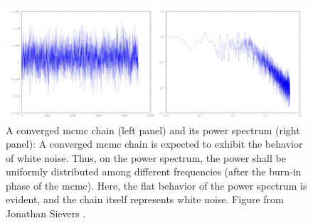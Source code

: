 \documentclass[12pt, TexShade, letterpaper]{report}
\begin{document}
\begin{figure}[h!]
\centering
\includegraphics[scale =0.9]{mcmc_converged.jpg}
\caption[A converged \gls{mcmc} chain and its power spectrum]{A converged \gls{mcmc} chain (left panel) and its power spectrum (right panel): A converged \gls{mcmc} chain is expected to exhibit the behavior of white noise. Thus, on the power spectrum, the power shall be uniformly distributed among different frequencies (after the burn-in phase of the \gls{mcmc}). Here, the flat behavior of the power spectrum is evident, and the chain itself represents white noise. Figure from Jonathan Sievers \cite{mcmc_convergence_plot}.}
\label{fig:MCMC_converged}
\end{figure}

\end{document}
